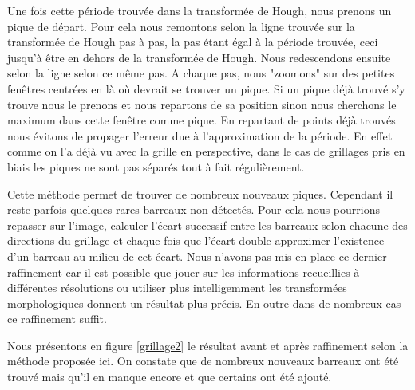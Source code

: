 Une fois cette période trouvée dans la transformée de Hough, nous prenons un pique de départ. Pour cela nous remontons selon la ligne trouvée sur la transformée de Hough pas à pas, la pas étant égal à la période trouvée, ceci jusqu'à être en dehors de la transformée de Hough. Nous redescendons ensuite selon la ligne selon ce même pas. A chaque pas, nous "zoomons" sur des petites fenêtres centrées en là où devrait se trouver un pique. Si un pique déjà trouvé s'y trouve nous le prenons et nous repartons de sa position sinon nous cherchons le maximum dans cette fenêtre comme pique. En repartant de points déjà trouvés nous évitons de propager l'erreur due à l'approximation de la période. En effet comme on l'a déjà vu avec la grille en perspective, dans le cas de grillages pris en biais les piques ne sont pas séparés tout à fait régulièrement.

Cette méthode permet de trouver de nombreux nouveaux piques. Cependant il reste parfois quelques rares barreaux non détectés. Pour cela nous pourrions repasser sur l'image, calculer l'écart successif entre les barreaux selon chacune des directions du grillage et chaque fois que l'écart double approximer l'existence d'un barreau au milieu de cet écart. Nous n'avons pas mis en place ce dernier raffinement car il est possible que jouer sur les informations recueillies à différentes résolutions ou utiliser plus intelligemment les transformées morphologiques donnent un résultat plus précis. En  outre dans de nombreux cas ce raffinement suffit.

Nous présentons en figure \ref{grillage2} le résultat avant et après raffinement selon la méthode proposée ici. On constate que de nombreux nouveaux barreaux ont été trouvé mais qu'il en manque encore et que certains ont été ajouté.

